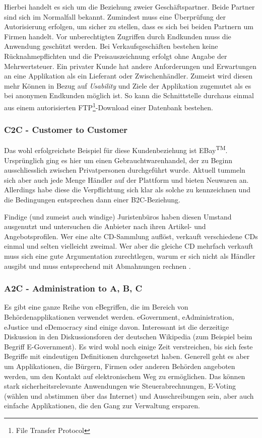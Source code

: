 Hierbei handelt es sich um die Beziehung zweier Geschäftspartner. Beide Partner
sind sich im Normalfall bekannt. Zumindest muss eine Überprüfung der Autorisierung
erfolgen, um sicher zu stellen, dass es sich bei beiden Partnern um Firmen handelt.
Vor unberechtigten Zugriffen durch Endkunden muss die Anwendung geschützt werden.
Bei Verkaufsgeschäften bestehen keine Rücknahmepflichten und die Preisauszeichnung
erfolgt ohne Angabe der Mehrwertsteuer. Ein privater Kunde hat andere Anforderungen
und Erwartungen an eine Applikation als ein Lieferant oder Zwischenhändler.
Zumeist wird diesen mehr Können in Bezug auf \emph{Usability} und Ziele der
Applikation zugemutet als es bei anonymen Endkunden möglich ist. So kann die
Schnittstelle durchaus einmal aus einem autorisierten
FTP\footnote{File Transfer Protocol}-Download einer Datenbank bestehen.

\subsubsection*{C2C - Customer to Customer}

Das wohl erfolgreichste Beispiel für diese Kundenbeziehung ist EBay\textsuperscript{TM}.
Ursprünglich ging es hier um einen Gebrauchtwarenhandel, der zu Beginn
ausschliesslich zwischen Privatpersonen durchgeführt wurde. Aktuell tummeln
sich aber auch jede Menge Händler auf der Plattform und bieten Neuwaren an.
Allerdings habe diese die Verpflichtung sich klar als solche zu kennzeichnen
und die Bedingungen entsprechen dann einer B2C-Beziehung.

Findige (und zumeist auch windige) Juristenbüros haben diesen Umstand
ausgenutzt und untersuchen die Anbieter nach ihren Artikel- und Angebotsprofilen.
Wer eine alte CD-Sammlung auflöst, verkauft verschiedene CDs einmal und selten
vielleicht zweimal. Wer aber die gleiche CD mehrfach verkauft muss sich eine
gute Argumentation zurechtlegen, warum er sich nicht als Händler ausgibt
und muss entsprechend mit Abmahnungen rechnen .

\subsubsection*{A2C - Administration to A, B, C}

Es gibt eine ganze Reihe von eBegriffen, die im Bereich von Behördenapplikationen
verwendet werden. eGovernment, eAdministration, eJustice und eDemocracy sind
einige davon. Interessant ist die derzeitige Diskussion in den Diskussionsforen
der deutschen Wikipedia (zum Beispiel beim Begriff E-Government). Es wird
wohl noch einige Zeit verstreichen, bis sich feste Begriffe mit eindeutigen
Definitionen durchgesetzt haben. Generell geht es aber um Applikationen,
die Bürgern, Firmen oder anderen Behörden angeboten werden, um den Kontakt
auf elektronischem Weg zu ermöglichen. Das können stark sicherheitsrelevante
Anwendungen wie Steuerabrechnungen, E-Voting (wählen und abstimmen über das
Internet) und Ausschreibungen sein, aber auch einfache Applikationen, die den
Gang zur Verwaltung ersparen.

